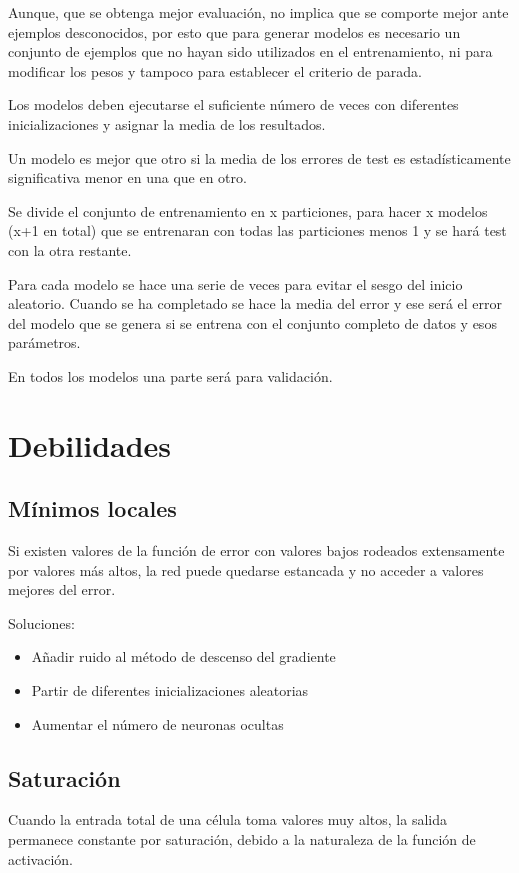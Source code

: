 \documentclass[12pt, twoside, openright]{report} %
\begin{document}
Aunque, que se obtenga mejor evaluación, no implica que se comporte mejor ante ejemplos desconocidos, por esto que para generar modelos es necesario un conjunto de ejemplos que no hayan sido utilizados en el entrenamiento, ni para modificar los pesos y tampoco para establecer el criterio de parada. 

Los modelos deben ejecutarse el suficiente número de veces con diferentes inicializaciones y asignar la media de los resultados.

Un modelo es mejor que otro si la media de los errores de test es estadísticamente significativa menor en una que en otro.

Se divide el conjunto de entrenamiento en x particiones, para hacer x modelos (x+1 en total) que se entrenaran con todas las particiones menos 1 y se hará test con la otra restante.

Para cada modelo se hace una serie de veces para evitar el sesgo del inicio aleatorio. Cuando se ha completado se hace la media del error y ese será el error del modelo que se genera si se entrena con el conjunto completo de datos y esos parámetros.

En todos los modelos una parte será para validación.

\section{Debilidades}
\subsection{Mínimos locales}
Si existen valores de la función de error con valores bajos rodeados extensamente por valores más altos, la red puede quedarse estancada y no acceder a valores mejores del error.

Soluciones:
\begin{itemize}
	\item Añadir ruido al método de descenso del gradiente
	\item Partir de diferentes inicializaciones aleatorias
	\item Aumentar el número de neuronas ocultas
\end{itemize}

\subsection{Saturación}
Cuando la entrada total de una célula toma valores muy altos, la salida permanece constante por saturación, debido a la naturaleza de la función de activación.
\end{document}
